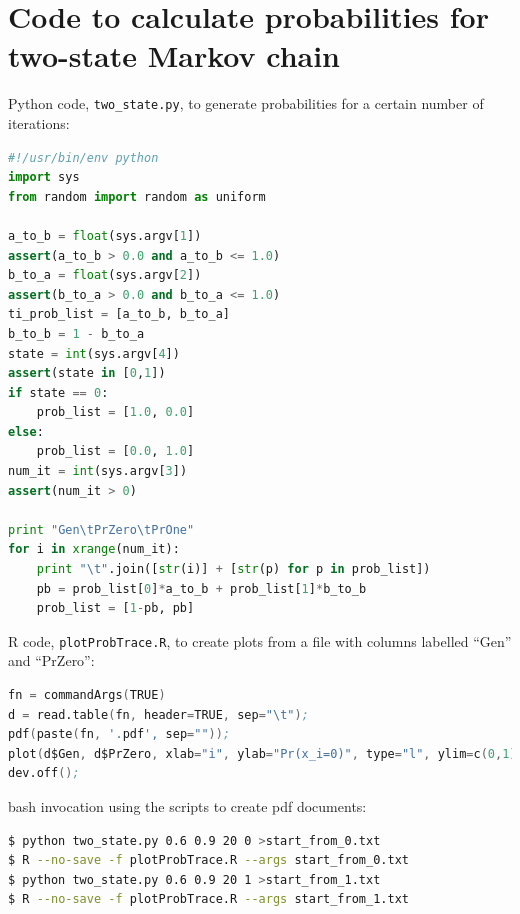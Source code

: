 \documentclass[11pt]{article}
\begin{document}
\newpage

\appendix
\section{Code to calculate probabilities for two-state Markov chain}\label{appendixCodeTwoProb}
Python code, {\tt two\_state.py}, to generate probabilities for a certain number of iterations:
\begin{lstlisting}[frame=single,language=Python,columns=fixed,upquote=false,showstringspaces=false]
#!/usr/bin/env python
import sys
from random import random as uniform

a_to_b = float(sys.argv[1])
assert(a_to_b > 0.0 and a_to_b <= 1.0)
b_to_a = float(sys.argv[2])
assert(b_to_a > 0.0 and b_to_a <= 1.0)
ti_prob_list = [a_to_b, b_to_a]
b_to_b = 1 - b_to_a
state = int(sys.argv[4])
assert(state in [0,1])
if state == 0:
    prob_list = [1.0, 0.0]
else:
    prob_list = [0.0, 1.0]
num_it = int(sys.argv[3])
assert(num_it > 0)

print "Gen\tPrZero\tPrOne"
for i in xrange(num_it):
    print "\t".join([str(i)] + [str(p) for p in prob_list])
    pb = prob_list[0]*a_to_b + prob_list[1]*b_to_b
    prob_list = [1-pb, pb]
\end{lstlisting}
R code, {\tt plotProbTrace.R}, to create plots from a file with columns labelled ``Gen'' and ``PrZero'':
\begin{lstlisting}[frame=single,language=S,columns=fixed,upquote=false,showstringspaces=false]
fn = commandArgs(TRUE)
d = read.table(fn, header=TRUE, sep="\t");
pdf(paste(fn, '.pdf', sep=""));
plot(d$Gen, d$PrZero, xlab="i", ylab="Pr(x_i=0)", type="l", ylim=c(0,1));
dev.off();
\end{lstlisting}
bash invocation using the scripts to create pdf documents:
\begin{lstlisting}[frame=single,language=bash,columns=fixed,upquote=false,showstringspaces=false]
$ python two_state.py 0.6 0.9 20 0 >start_from_0.txt
$ R --no-save -f plotProbTrace.R --args start_from_0.txt
$ python two_state.py 0.6 0.9 20 1 >start_from_1.txt
$ R --no-save -f plotProbTrace.R --args start_from_1.txt
\end{lstlisting}


\end{document}
